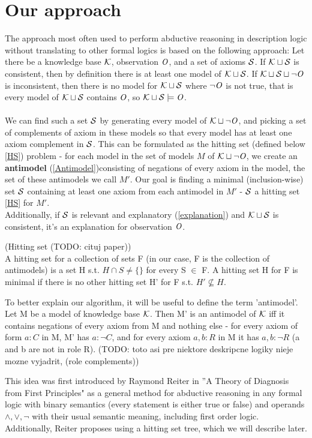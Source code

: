 \chapter{Our approach}\label{chap:proposal}
The approach most often used to perform abductive reasoning in description logic without translating to other formal logics is based on the following approach:
Let there be a knowledge base $\K$, observation $\Obs$, and a set of axioms $\S$. If $\K \sqcup \S$ is consistent, then by definition there is at least one model of $\K \sqcup \S$.  If $\K \sqcup \S \sqcup \neg \Obs$ is inconsistent, then there is no model for $\K \sqcup \S$ where $\neg \Obs$ is not true, that is every model of $\K \sqcup \S$ contains $\Obs$, so $\K \sqcup \S \models \Obs$. \\ \\
We can find such a set $\S$ by generating every model of $\K \sqcup \neg \Obs$, and picking a set of complements of axiom in these models so that every model has at least one axiom complement in $\S$. This can be formulated as the hitting set (defined below \ref{HS}) problem - for each model in the set of models $M$ of  $\K \sqcup \neg \Obs$, we create an \textbf{antimodel} (\ref{Antimodel})consisting of negations of every axiom in the model, the set of these antimodels we call $M'$. Our goal is finding a minimal (inclusion-wise) set $\S$ containing at least one axiom from each antimodel in $M'$ - $\S$ a hitting set \ref{HS} for $M'$.
\\

Additionally, if $\S$ is relevant and explanatory (\ref{explanation}) and $\K \sqcup \S$ is consistent, it's an explanation for observation $\Obs$.
\\ 

\begin{mydef} \label{HS} (Hitting set  (TODO: cituj paper)) \\
A hitting set for a collection of
sets F (in our case, F is the collection of antimodels) is a set H s.t. $H \cap S \neq  \{\}$ for every S $\in$ F. A hitting set H for F is
minimal if there is no other hitting set H' for F s.t. $H' \not \subseteq H$.
\end{mydef}
\begin{mydef} \label{Antimodel} 
To better explain our algorithm, it will be useful to define the term 'antimodel'. Let M be a model of knowledge base $\K$. Then M' is an antimodel of $\K$ iff it contains negations of every axiom from M and nothing else - for every axiom of form $a:C$ in M, M' has $a:\neg C$, and for every axiom $a,b:R$ in M it has $a,b:\neg R$ (a and b are not in role R). (TODO: toto asi pre niektore deskripcne logiky nieje mozne vyjadrit, (role complements))
\end{mydef}
This idea was first introduced by Raymond Reiter in ''A Theory of Diagnosis from First Principles" \cite{Reiter1987} as a general method for abductive reasoning in any formal logic with binary semantics (every statement is either true or false) and operands $\land , \lor, \neg$  with their usual semantic meaning, including first order logic. Additionally, Reiter proposes using a hitting set tree, which we will describe later.


